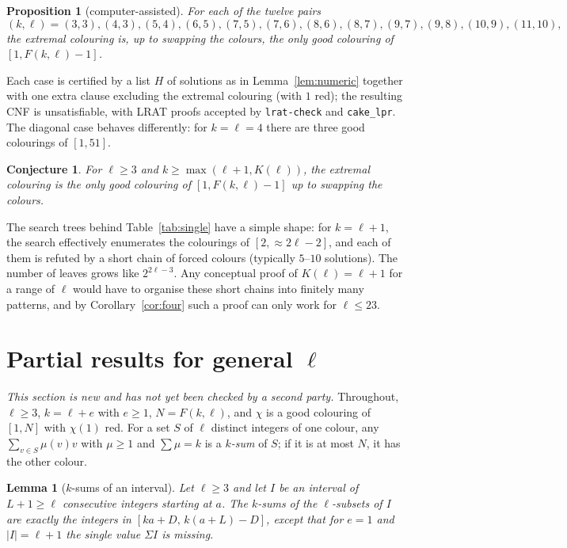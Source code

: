 \documentclass[11pt]{amsart}
\newtheorem{lemma}[theorem]{Lemma}
\newtheorem{proposition}[theorem]{Proposition}
\newtheorem{conjecture}[theorem]{Conjecture}
\theoremstyle{definition}
\newcommand{\F}{F}
\begin{document}
\begin{proposition}[computer-assisted]\label{prop:unique}
For each of the twelve pairs
\[(k,\ell)=(3,3),(4,3),(5,4),(6,5),(7,5),(7,6),(8,6),(8,7),(9,7),(9,8),(10,9),(11,10),\]
the extremal colouring is, up to swapping the colours, the only good colouring of $[1,\F(k,\ell)-1]$.
\end{proposition}

\noindent Each case is certified by a list $H$ of solutions as in Lemma~\ref{lem:numeric} together with one extra clause excluding the extremal colouring (with $1$ red); the resulting CNF is unsatisfiable, with LRAT proofs accepted by \texttt{lrat-check} and \texttt{cake\_lpr}. The diagonal case behaves differently: for $k=\ell=4$ there are three good colourings of $[1,51]$.

\begin{conjecture}\label{conj:unique}
For $\ell\ge3$ and $k\ge\max(\ell+1,K(\ell))$, the extremal colouring is the only good colouring of $[1,\F(k,\ell)-1]$ up to swapping the colours.
\end{conjecture}

\noindent The search trees behind Table~\ref{tab:single} have a simple shape: for $k=\ell+1$, the search effectively enumerates the colourings of $[2,\approx2\ell-2]$, and each of them is refuted by a short chain of forced colours (typically $5$--$10$ solutions). The number of leaves grows like $2^{2\ell-3}$. Any conceptual proof of $K(\ell)=\ell+1$ for a range of $\ell$ would have to organise these short chains into finitely many patterns, and by Corollary~\ref{cor:four} such a proof can only work for $\ell\le23$.

\section{Partial results for general $\ell$}\label{sec:general}

\noindent\emph{This section is new and has not yet been checked by a second party.} Throughout, $\ell\ge3$, $k=\ell+e$ with $e\ge1$, $N=\F(k,\ell)$, and $\chi$ is a good colouring of $[1,N]$ with $\chi(1)$ red. For a set $S$ of $\ell$ distinct integers of one colour, any $\sum_{v\in S}\mu(v)v$ with $\mu\ge1$ and $\sum\mu=k$ is a \emph{$k$-sum} of $S$; if it is at most $N$, it has the other colour.

\begin{lemma}[$k$-sums of an interval]\label{lem:interval}
Let $\ell\ge3$ and let $I$ be an interval of $L+1\ge\ell$ consecutive integers starting at $a$. The $k$-sums of the $\ell$-subsets of $I$ are exactly the integers in $[ka+D,\,k(a+L)-D]$, except that for $e=1$ and $|I|=\ell+1$ the single value $\Sigma I$ is missing.
\end{lemma}
\end{document}
